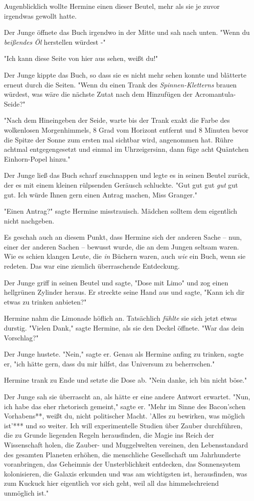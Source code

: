 {Augenblicklich wollte Hermine einen dieser Beutel, mehr als sie je zuvor irgendwas gewollt hatte.

Der Junge öffnete das Buch irgendwo in der Mitte und sah nach unten. "Wenn du \emph{beißendes Öl} herstellen würdest -"

"Ich kann diese Seite von hier aus sehen, weißt du!"

Der Junge kippte das Buch, so dass sie es nicht mehr sehen konnte und blätterte erneut durch die Seiten. "Wenn du einen Trank des \emph{Spinnen-Kletterns} brauen würdest, was wäre die nächste Zutat nach dem Hinzufügen der Acromantula-Seide?"

"Nach dem Hineingeben der Seide, warte bis der Trank exakt die Farbe des wolkenlosen Morgenhimmels, 8 Grad vom Horizont entfernt und 8 Minuten bevor die Spitze der Sonne zum ersten mal sichtbar wird, angenommen hat. Rühre achtmal entgegengesetzt und einmal im Uhrzeigersinn, dann füge acht Quäntchen Einhorn-Popel hinzu."

Der Junge ließ das Buch scharf zuschnappen und legte es in seinen Beutel zurück, der es mit einem kleinen rülpsenden Geräusch schluckte. "Gut gut gut \emph{gut} gut gut. Ich würde Ihnen gern einen Antrag machen, Miss Granger."

"Einen Antrag?" sagte Hermine misstrauisch. Mädchen solltem dem eigentlich nicht nachgeben.

Es geschah auch an diesem Punkt, dass Hermine sich der anderen Sache -- nun, einer der anderen Sachen -- bewusst wurde, die an dem Jungen seltsam waren. Wie es schien klangen Leute, die \emph{in} Büchern waren, auch \emph{wie} ein Buch, wenn sie redeten. Das war eine ziemlich überraschende Entdeckung.

Der Junge griff in seinen Beutel und sagte, "Dose mit Limo" und zog einen hellgrünen Zylinder heraus. Er streckte seine Hand aus und sagte, "Kann ich dir etwas zu trinken anbieten?"

Hermine nahm die Limonade höflich an. Tatsächlich \emph{fühlte} sie sich jetzt etwas durstig. "Vielen Dank," sagte Hermine, als sie den Deckel öffnete. "War das dein Vorschlag?"

Der Junge hustete. "Nein," sagte er. Genau als Hermine anfing zu trinken, sagte er, "ich hätte gern, dass du mir hilfst, das Universum zu beherrschen."

Hermine trank zu Ende und setzte die Dose ab. "Nein danke, ich bin nicht böse."

Der Junge sah sie überrascht an, als hätte er eine andere Antwort erwartet. "Nun, ich habe das eher rhetorisch gemeint," sagte er. "Mehr im Sinne des Bacon'schen Vorhabens**, weißt du, nicht politischer Macht. 'Alles zu bewirken, was möglich ist'*** und so weiter. Ich will experimentelle Studien über Zauber durchführen, die zu Grunde liegenden Regeln herausfinden, die Magie ins Reich der Wissenschaft holen, die Zauber- und Muggelwelten vereinen, den Lebensstandard des gesamten Planeten erhöhen, die menschliche Gesellschaft um Jahrhunderte voranbringen, das Geheimnis der Unsterblichkeit entdecken, das Sonnensystem kolonisieren, die Galaxis erkunden und was am wichtigsten ist, herausfinden, was zum Kuckuck hier eigentlich vor sich geht, weil all das himmelschreiend unmöglich ist."

}
